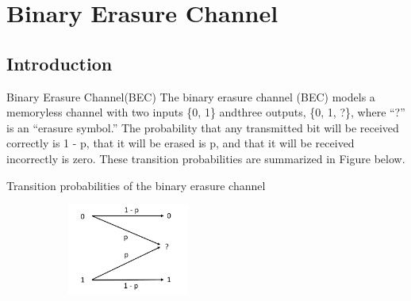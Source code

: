 \section{\textbf{Binary Erasure Channel}}
\subsection{Introduction}
\begin{frame}{Binary Erasure Channel(BEC)}
\;\;\;\;\;\;\;\;The binary erasure channel (BEC) models a memoryless channel with two inputs \{0, 1\} andthree outputs, \{0, 1, ?\}, where “?” is an “erasure symbol.” The probability that any transmitted
bit will be received correctly is 1 - p, that it will be erased is p, and that it will be received
incorrectly is zero. These transition probabilities are summarized in Figure  below.  
\begin{alertblock}{Transition probabilities of the binary erasure channel}
\begin{figure}
			\includegraphics[width=6cm, height=3cm]{BEC/bec pic.png}
			\label{bec}
\end{figure}
\end{alertblock}
\end{frame}

